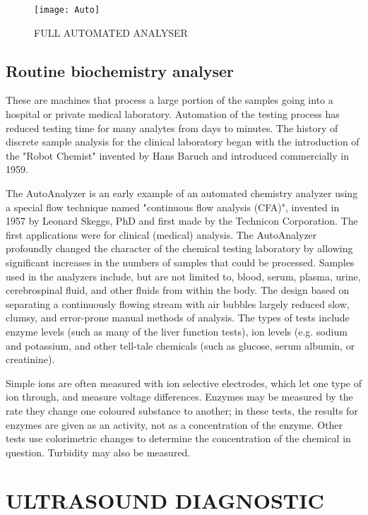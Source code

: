 \documentclass[12pt]{article}
\begin{document}
\begin{figure}[h]
    \centering
    \texttt{[image: Auto]}
    \caption{FULL AUTOMATED ANALYSER}
    \label{fig_Auto}
\end{figure}

\subsection{Routine biochemistry analyser}

These are machines that process a large portion of the samples going into a hospital or private medical laboratory. Automation of the testing process has reduced testing time for many analytes from days to minutes. The history of discrete sample analysis for the clinical laboratory began with the introduction of the "Robot Chemist" invented by Hans Baruch and introduced commercially in 1959.

The AutoAnalyzer is an early example of an automated chemistry analyzer using a special flow technique named "continuous flow analysis (CFA)", invented in 1957 by Leonard Skeggs, PhD and first made by the Technicon Corporation. The first applications were for clinical (medical) analysis. The AutoAnalyzer profoundly changed the character of the chemical testing laboratory by allowing significant increases in the numbers of samples that could be processed. Samples used in the analyzers include, but are not limited to, blood, serum, plasma, urine, cerebrospinal fluid, and other fluids from within the body. The design based on separating a continuously flowing stream with air bubbles largely reduced slow, clumsy, and error-prone manual methods of analysis. The types of tests include enzyme levels (such as many of the liver function tests), ion levels (e.g. sodium and potassium, and other tell-tale chemicals (such as glucose, serum albumin, or creatinine).

Simple ions are often measured with ion selective electrodes, which let one type of ion through, and measure voltage differences. Enzymes may be measured by the rate they change one coloured substance to another; in these tests, the results for enzymes are given as an activity, not as a concentration of the enzyme. Other tests use colorimetric changes to determine the concentration of the chemical in question. Turbidity may also be measured.
\clearpage


\section{ULTRASOUND DIAGNOSTIC}
\end{document}
